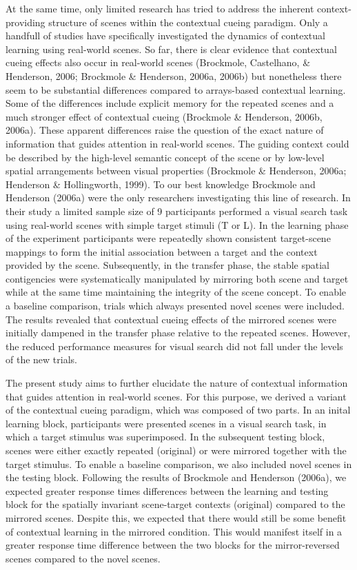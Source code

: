 \documentclass[
  man,floatsintext]{apa7}
\begin{document}
At the same time, only limited research has tried to address the inherent context-providing structure of scenes within the contextual cueing paradigm. Only a handfull of studies have specifically investigated the dynamics of contextual learning using real-world scenes. So far, there is clear evidence that contextual cueing effects also occur in real-world scenes (Brockmole, Castelhano, \& Henderson, 2006; Brockmole \& Henderson, 2006a, 2006b) but nonetheless there seem to be substantial differences compared to arrays-based contextual learning. Some of the differences include explicit memory for the repeated scenes and a much stronger effect of contextual cueing (Brockmole \& Henderson, 2006b, 2006a). These apparent differences raise the question of the exact nature of information that guides attention in real-world scenes. The guiding context could be described by the high-level semantic concept of the scene or by low-level spatial arrangements between visual properties (Brockmole \& Henderson, 2006a; Henderson \& Hollingworth, 1999). To our best knowledge Brockmole and Henderson (2006a) were the only researchers investigating this line of research. In their study a limited sample size of 9 participants performed a visual search task using real-world scenes with simple target stimuli (T or L). In the learning phase of the experiment participants were repeatedly shown consistent target-scene mappings to form the initial association between a target and the context provided by the scene. Subsequently, in the transfer phase, the stable spatial contigencies were systematically manipulated by mirroring both scene and target while at the same time maintaining the integrity of the scene concept. To enable a baseline comparison, trials which always presented novel scenes were included. The results revealed that contextual cueing effects of the mirrored scenes were initially dampened in the transfer phase relative to the repeated scenes. However, the reduced performance measures for visual search did not fall under the levels of the new trials.

The present study aims to further elucidate the nature of contextual information that guides attention in real-world scenes. For this purpose, we derived a variant of the contextual cueing paradigm, which was composed of two parts. In an inital learning block, participants were presented scenes in a visual search task, in which a target stimulus was superimposed. In the subsequent testing block, scenes were either exactly repeated (original) or were mirrored together with the target stimulus. To enable a baseline comparison, we also included novel scenes in the testing block. Following the results of Brockmole and Henderson (2006a), we expected greater response times differences between the learning and testing block for the spatially invariant scene-target contexts (original) compared to the mirrored scenes. Despite this, we expected that there would still be some benefit of contextual learning in the mirrored condition. This would manifest itself in a greater response time difference between the two blocks for the mirror-reversed scenes compared to the novel scenes.
\end{document}
